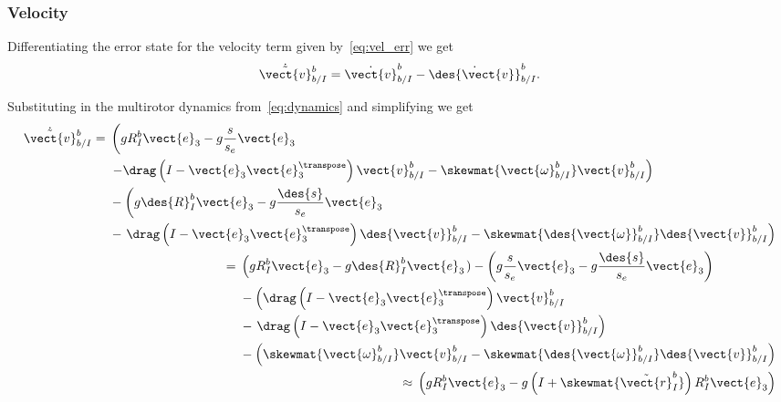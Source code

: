 \subsubsection{Velocity}

Differentiating the error state for the velocity term given
by~\eqref{eq:vel_err} we get
\begin{equation}
  \dot{\tilde{\vect{v}}}_{b/I}^{b} = \dot{\vect{v}}_{b/I}^{b} -
    \dot{\des{\vect{v}}}_{b/I}^{b}.
\end{equation}

Substituting in the multirotor dynamics from~\eqref{eq:dynamics} and simplifying
we get
\begin{align}
\begin{split}
  \dot{\tilde{\vect{v}}}_{b/I}^{b} ={}& \left(gR_I^b \vect{e}_3 -
    g\frac{s}{s_e}\vect{e}_3\right. \\
    &\left.-\drag \left( I - \vect{e}_3 \vect{e}_3^\transpose \right) \vect{v}_{b/I}^b -
                  \skewmat{\vect{\omega}_{b/I}^b}\vect{v}_{b/I}^b\right) \\
    &- \left(g\des{R}_I^b \vect{e}_3 - g\frac{\des{s}}{s_e}\vect{e}_3 \right. \\
    &- \left.\drag \left( I - \vect{e}_3 \vect{e}_3^\transpose \right) \des{\vect{v}}_{b/I}^b -
    \skewmat{\des{\vect{\omega}}_{b/I}^b}\des{\vect{v}}_{b/I}^b\right) \\
\end{split} \\
\begin{split}
  \phantom{\dot{\tilde{\vect{v}}}_{b/I}^{b}}={}& \left(gR_I^b \vect{e}_3 -
  g\des{R}_I^b \vect{e}_3\right.) - \left(g\frac{s}{s_e}\vect{e}_3 -
      g\frac{\des{s}}{s_e}\vect{e}_3\right) \\
    &-\left(\drag \left( I - \vect{e}_3 \vect{e}_3^\transpose \right)
      \vect{v}_{b/I}^b\right. \\
    &- \left.\drag \left( I - \vect{e}_3 \vect{e}_3^\transpose \right) \des{\vect{v}}_{b/I}^b
    \right) \\
    &- \left(\skewmat{\vect{\omega}_{b/I}^b}\vect{v}_{b/I}^b -
    \skewmat{\des{\vect{\omega}}_{b/I}^b} \des{\vect{v}}_{b/I}^b\right) \\
\end{split} \\
\begin{split}
  \phantom{\dot{\tilde{\vect{v}}}_{b/I}^{b}} \approx {}& \left(gR_I^b \vect{e}_3 -
    g\left( I + \skewmat{\tilde{\vect{r}}_I^b} \right) R_{I}^{b}
  \vect{e}_3\right) \\

\end{split}
\end{align}
